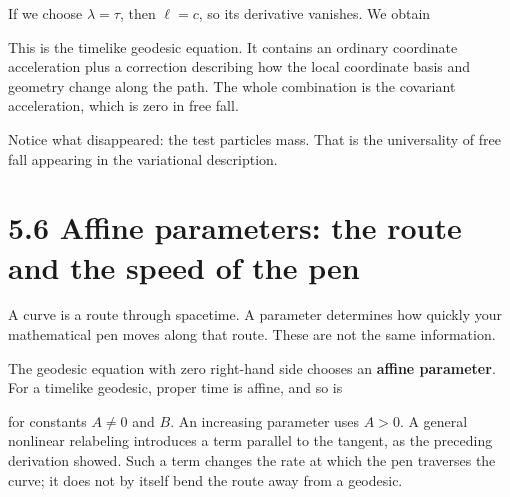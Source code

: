 \documentclass[
  11pt,
  letterpaper,
  oneside,
  openany]{scrbook}
\begin{document}
If we choose \(\lambda=\tau\), then \(\ell=c\), so its derivative
vanishes. We obtain

\begin{center}
\begingroup
{}
\ifdim\wd\grmathbox>\linewidth
\resizebox{\linewidth}{!}{\usebox{\grmathbox}}
\else\usebox{\grmathbox}\fi
\endgroup
\end{center}

This is the timelike geodesic equation. It contains an ordinary
coordinate acceleration plus a correction describing how the local
coordinate basis and geometry change along the path. The whole
combination is the covariant acceleration, which is zero in free fall.

Notice what disappeared: the test particle\textquotesingle s mass. That
is the universality of free fall appearing in the variational
description.

\hypertarget{affine-parameters-the-route-and-the-speed-of-the-pen}{%
\section{5.6 Affine parameters: the route and the speed of the
pen}\label{affine-parameters-the-route-and-the-speed-of-the-pen}}

A curve is a route through spacetime. A parameter determines how quickly
your mathematical pen moves along that route. These are not the same
information.

The geodesic equation with zero right-hand side chooses an
\textbf{affine parameter}. For a timelike geodesic, proper time is
affine, and so is

\begin{center}
\begingroup
{}
\ifdim\wd\grmathbox>\linewidth
\resizebox{\linewidth}{!}{\usebox{\grmathbox}}
\else\usebox{\grmathbox}\fi
\endgroup
\end{center}

for constants \(A\ne0\) and \(B\). An increasing parameter uses \(A>0\).
A general nonlinear relabeling introduces a term parallel to the
tangent, as the preceding derivation showed. Such a term changes the
rate at which the pen traverses the curve; it does not by itself bend
the route away from a geodesic.
\end{document}
